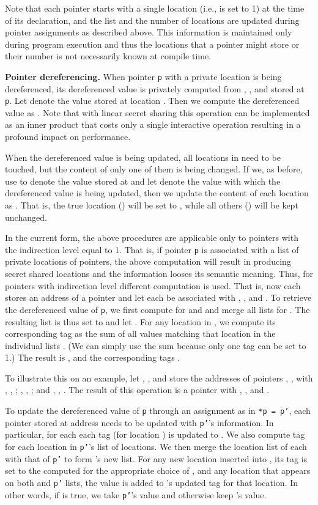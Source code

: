 \documentclass[11pt]{article}
\begin{document}
Note that each pointer starts with a single location (i.e., 
is set to 1) at the time of its declaration, and the list and the
number of locations  are updated during pointer assignments as
described above. This information is maintained only during program
execution and thus the locations that a pointer might store or their
number is not necessarily known at compile time.

\medskip \noindent \textbf{Pointer dereferencing.} When pointer \texttt{p}
with a private location is being dereferenced, its dereferenced value is
privately computed from , ,
and  stored at \texttt{p}. Let 
denote the value stored at location . Then we compute the
dereferenced value as . Note that
with linear secret sharing this operation can be implemented as an inner
product that costs only a single interactive operation resulting in a
profound impact on performance.

When the dereferenced value is being updated, all locations in  need to
be touched, but the content of only one of them is being changed. If we, as
before, use  to denote the value stored at  and let
 denote the value with which the dereferenced value is being
updated, then we update the content of each location  as . That is, the true location
() will be set to , while all others () will be
kept unchanged.

In the current form, the above procedures are applicable only to pointers
with the indirection level equal to 1. That is, if pointer \texttt{p} is
associated with a list of private locations of pointers, the above
computation will result in producing secret shared locations and the
information looses its semantic meaning. Thus, for pointers with indirection
level  different computation is used. That is, now each 
stores an address of a pointer  and let each  be associated with
, , and
. To retrieve the
dereferenced value of \texttt{p}, we first compute 
for  and  and merge all lists
 for . The resulting list is thus set to  and let . For any
location in , we compute its corresponding tag as the sum of all  values matching that location in the individual lists
. (We can simply use the sum because only one tag can be set to 1.) The
result is ,  and the corresponding tags .

To illustrate this on an example, let , ,
and  store the addresses of pointers , ,  with , , ; , , ; and , , . The result of this operation is a pointer with , , and .

To update the dereferenced value of \texttt{p} through an assignment as in 
\texttt{*p = p'}, each pointer  stored at address  needs
to be updated with \texttt{p'}'s information.  In particular, for each 
each tag  (for location ) is updated to
. We also compute tag  for
each location  in \texttt{p'}'s list of locations. We then merge
the location list of each  with that of \texttt{p'} to form 's new
list. For any new location inserted into , its tag is set to the
computed  for the appropriate choice of , and any
location that appears on both  and \texttt{p'} lists, the value
 is added to 's updated tag for that location. In
other words, if  is true, we take \texttt{p'}'s value and otherwise
keep 's value.
\end{document}
